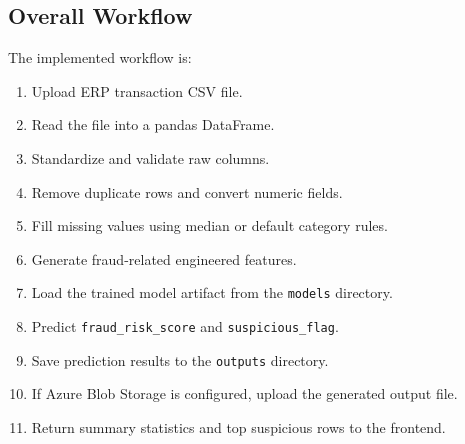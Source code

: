 \documentclass[a4paper,12pt]{article}
\begin{document}
\subsection{Overall Workflow}
The implemented workflow is:
\begin{enumerate}[noitemsep]
    \item Upload ERP transaction CSV file.
    \item Read the file into a pandas DataFrame.
    \item Standardize and validate raw columns.
    \item Remove duplicate rows and convert numeric fields.
    \item Fill missing values using median or default category rules.
    \item Generate fraud-related engineered features.
    \item Load the trained model artifact from the \texttt{models} directory.
    \item Predict \texttt{fraud\_risk\_score} and \texttt{suspicious\_flag}.
    \item Save prediction results to the \texttt{outputs} directory.
    \item If Azure Blob Storage is configured, upload the generated output file.
    \item Return summary statistics and top suspicious rows to the frontend.
\end{enumerate}
\end{document}
